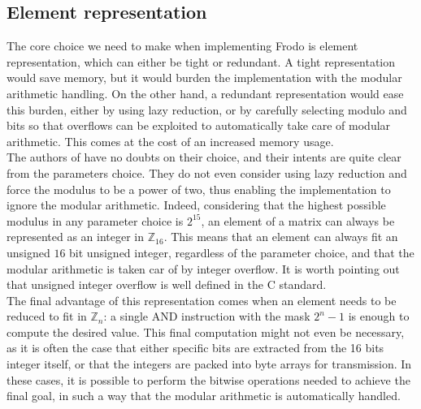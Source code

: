 \subsection{Element representation}
The core choice we need to make when implementing Frodo is element representation, which can either be tight or redundant. A tight representation would save memory, but it would burden the implementation with the modular arithmetic handling. On the other hand, a redundant representation would ease this burden, either by using lazy reduction, or by carefully selecting modulo and bits so that overflows can be exploited to automatically take care of modular arithmetic. This comes at the cost of an increased memory usage.\\
The authors of \cite{frodo} have no doubts on their choice, and their intents are quite clear from the parameters choice. They do not even consider using lazy reduction and force the modulus to be a power of two, thus enabling the implementation to ignore the modular arithmetic. Indeed, considering that the highest possible modulus in any parameter choice is $2^{15}$, an element of a matrix can always be represented as an integer in $\mathbb{Z}_{16}$. This means that an element can always fit an unsigned $16$ bit unsigned integer, regardless of the parameter choice, and that the modular arithmetic is taken car of by integer overflow. It is worth pointing out that unsigned integer overflow is well defined in the C standard.\\
The final advantage of this representation comes when an element needs to be reduced to fit in $\mathbb{Z}_n$: a single AND instruction with the mask $2^{n}-1$ is enough to compute the desired value. This final computation might not even be necessary, as it is often the case that either specific bits are extracted from the 16 bits integer itself, or that the integers are packed into byte arrays for transmission. In these cases, it is possible to perform the bitwise operations needed to achieve the final goal, in such a way that the modular arithmetic is automatically handled.\\

